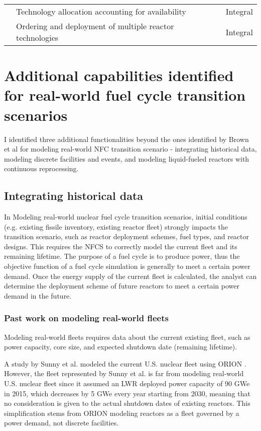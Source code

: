 \begin{table}[h]
\begin{tabularx}{\textwidth}{lXl}
        \hline

         & Technology allocation accounting for availability &Integral \\
        	& Ordering and deployment of multiple reactor technologies &Integral \\
        \hline
    \end{tabularx}
\end{table}

\section{Additional capabilities identified for real-world fuel cycle transition scenarios}
I identified three additional functionalities beyond the ones identified by Brown et al \cite{brown_identification_2016}
for modeling real-world \gls{NFC} transition scenario -
integrating historical data, modeling discrete facilities and events, and modeling liquid-fueled
reactors with continuous reprocessing.

\subsection{Integrating historical data}
In Modeling real-world nuclear fuel cycle transition scenarios, initial
conditions (e.g. existing fissile inventory, existing reactor fleet) 
strongly impacts
the transition scenario, such as reactor deployment
schemes, fuel types, and reactor designs. This requires the \gls{NFCS} to correctly model the current fleet and its
remaining lifetime. The purpose of a fuel cycle is to produce power, thus the objective
function of a fuel cycle simulation is generally to meet a certain power demand.
Once the energy supply of the current fleet is calculated,
the analyst can determine the deployment scheme of future reactors to meet a certain
power demand in the future. 

\subsubsection{Past work on modeling real-world fleets}
Modeling real-world fleets requires data about the current existing fleet,
such as power capacity, core size, and expected shutdown date (remaining lifetime).

A study by Sunny et al. modeled the current U.S. nuclear fleet
using ORION \cite{sunny_transition_2015}. However, the fleet represented
by Sunny et al. is far from
modeling real-world U.S. nuclear fleet since it assumed an \gls{LWR} deployed power capacity
of 90 GWe in 2015, which decreases by 5 GWe every year starting from 2030,
meaning that no consideration is given to the actual shutdown dates of
existing reactors. This simplification stems from ORION modeling reactors as
a fleet governed by a power demand, not discrete facilities.

